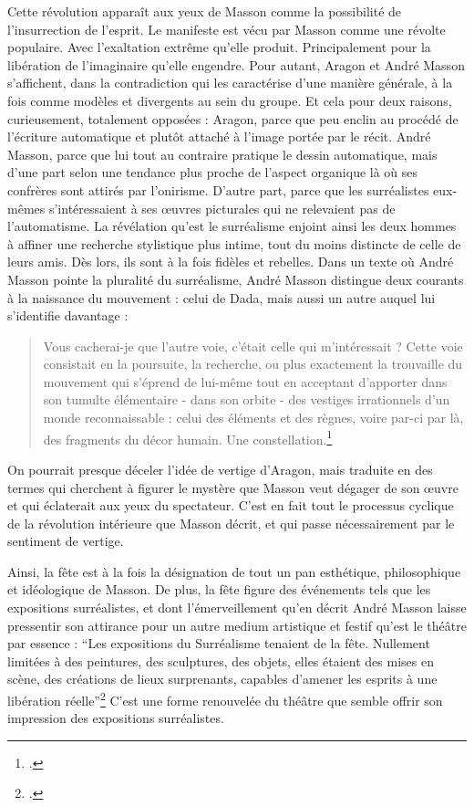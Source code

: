 Cette révolution apparaît aux yeux de Masson comme la possibilité de l’insurrection de l’esprit. Le manifeste est vécu par Masson comme une révolte populaire. Avec l’exaltation extrême qu’elle produit. Principalement pour la libération de l’imaginaire qu’elle engendre. Pour autant, Aragon et André Masson s’affichent, dans la contradiction qui les caractérise d’une manière générale, à la fois comme modèles et divergents au sein du groupe. Et cela pour deux raisons, curieusement, totalement opposées : Aragon, parce que peu enclin au procédé de l’écriture automatique et plutôt attaché à l’image portée par le récit. André Masson, parce que lui tout au contraire pratique le dessin automatique, mais d’une part selon une tendance plus proche de l’aspect organique là où ses confrères sont attirés par l’onirisme. D’autre part, parce que les surréalistes  eux-mêmes s’intéressaient à ses \oe{}uvres picturales qui ne relevaient pas de l’automatisme.  La révélation qu’est le surréalisme enjoint ainsi les deux hommes à affiner une recherche stylistique plus intime, tout du moins distincte de celle de leurs amis. Dès lors, ils sont à la fois fidèles et rebelles. Dans un texte où André Masson pointe la pluralité du surréalisme, André Masson distingue deux courants à la naissance du mouvement : celui de Dada, mais aussi un autre auquel lui s’identifie davantage : 

\begin{quote}
Vous cacherai-je que l’autre voie, c’était celle qui m’intéressait ? Cette voie consistait en la poursuite, la recherche, ou plus exactement la trouvaille du mouvement qui s’éprend de lui-même tout en acceptant d’apporter dans son tumulte élémentaire - dans son orbite - des vestiges irrationnels d’un monde reconnaissable : celui des éléments et des règnes, voire par-ci par là, des fragments du décor humain. Une constellation.\footcite[p34]{rebelle}\end{quote}


	On pourrait presque déceler l’idée de vertige d’Aragon, mais traduite en des termes qui cherchent à figurer le mystère que Masson veut dégager de son \oe{}uvre et qui éclaterait aux yeux du spectateur. C’est en fait tout le processus cyclique de la révolution intérieure que Masson décrit, et qui passe nécessairement par le sentiment de vertige. 

	Ainsi, la fête est à la fois la désignation de tout un pan esthétique, philosophique et idéologique de Masson. De plus, la fête figure des événements tels que les expositions surréalistes, et dont l’émerveillement qu’en décrit André Masson laisse pressentir son attirance pour un autre medium artistique et festif qu’est le théâtre par essence : \enquote{Les expositions du Surréalisme tenaient de la fête. Nullement limitées à des peintures, des sculptures, des objets, elles étaient des mises en scène, des créations de lieux surprenants, capables d’amener les esprits à une libération réelle}\footcite[p41]{memoiremonde} C’est une forme renouvelée du théâtre que semble offrir son impression des expositions surréalistes. 
	
